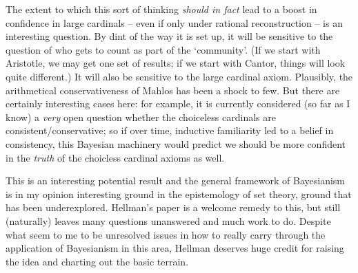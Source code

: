 \documentclass{amsart}
\theoremstyle{definition}
\begin{document}
The extent to which this sort of thinking \emph{should in fact} lead to a boost 
in confidence in large cardinals -- even if only under rational reconstruction --
is an interesting question. By dint of the way it is set up, it will be sensitive to 
the question of who gets to count as part of the `community'. (If we start with 
Aristotle, we may get one set of results; 
if we start with Cantor, things will look quite different.) It will also 
be sensitive to the large cardinal axiom. Plausibly, the arithmetical conservativeness of 
Mahlos has been a shock to few. But there are certainly 
interesting cases here: for example, it is currently considered (so far as I 
know) a \emph{very} open question whether the choiceless cardinals are consistent/conservative; 
so if over time, inductive familiarity led to a belief in consistency, this Bayesian 
machinery would predict we should be more confident in the \emph{truth} of the 
choicless cardinal axioms as well. 

This is an interesting potential result and the general framework of 
Bayesianism is in my opinion interesting ground in the epistemology of set theory,
ground that has been underexplored. Hellman's paper is a welcome remedy to this,
but still (naturally) leaves many questions unanswered and much work to do. Despite 
what seem to me to be unresolved issues in how to really carry through the application
of Bayesianism in this area, Hellman deserves huge credit for raising the idea 
and charting out the basic terrain.

%
\end{document}

